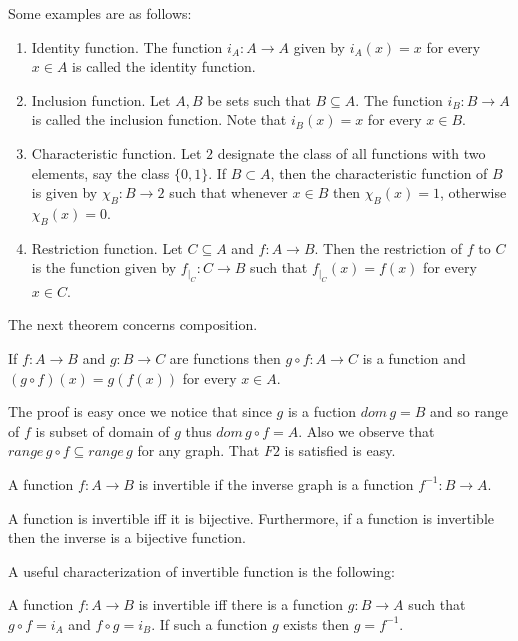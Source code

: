 Some examples are as follows:
\begin{enumerate}
    \item Identity function. The function $i_A : A \to A$ given by $i_A(x) = x$ 
	for every $ x\in A$ is called the identity function.  
    \item Inclusion function. Let $A,B$ be sets such that $B \subseteq A$. The function $i_B : B \to
	A$ is called the inclusion function. Note that $i_B(x) = x$ for every $x \in B$.
    \item Characteristic function. Let $2$ designate the class of all functions with two elements, say the
	class $\lbrace 0,1\rbrace$. If $B \subset A$, then the characteristic function of $B$ is
	given by $\chi_B : B \to 2$ such that whenever $x \in B$ then $\chi_B(x) = 1$, otherwise
	$\chi_B(x) = 0$. 
    \item Restriction function. Let $C \subseteq A$ and $f : A \to B$. Then the restriction of $f$
	to $C$ is the function given by $f_{|_C} : C \to B$ such that $f_{|_C}(x) = f(x)$ for every
	$x \in C$.
\end{enumerate}

The next theorem concerns composition.
\begin{Theorem}
    If $f : A \to B$ and $g : B \to C$ are functions then $g \circ f : A \to C $ is a function and
    $(g\circ f)(x) = g(f(x))$ for every $x \in A$.
\end{Theorem}
The proof is easy once we notice that since $g$ is a fuction $dom\,g = B$ and so range of $f$ is
subset of domain of $g$ thus $dom\,g\circ f = A$. Also we observe that $range\, g\circ f \subseteq
range\,g$ for any graph. That $F2$ is satisfied is easy.

\begin{Definition}
    A function $f : A \to B$ is invertible if the inverse graph is a function $f^{-1} : B \to A$.
\end{Definition}

\begin{Theorem}
    A function is invertible iff it is bijective. Furthermore, if a function is invertible then
    the inverse is a bijective function.
\end{Theorem}

A useful characterization of invertible function is the following:
\begin{Theorem}
    A function $f : A \to B$ is invertible iff there is a function $g : B \to A$ such that $g \circ
    f = i_A$ and $f\circ g = i_B$. If such a function $g$ exists then $g = f^{-1}$.
\end{Theorem}

